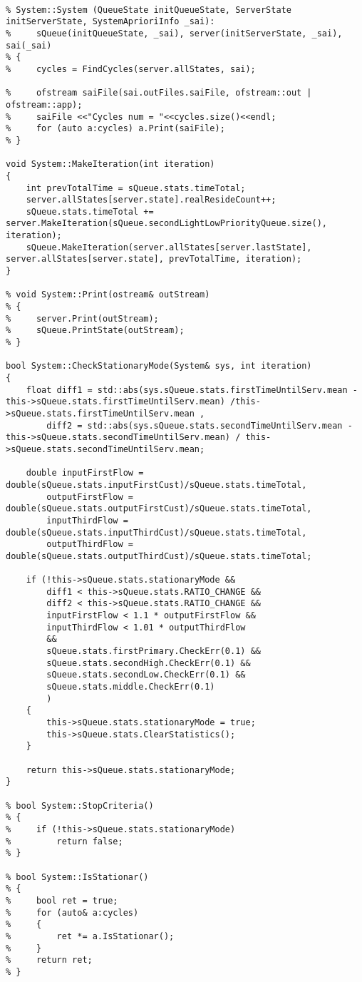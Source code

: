 \begin{lstlisting}[language={[ISO]C++}]
% #include "system.h"

% System::System (QueueState initQueueState, ServerState initServerState, SystemAprioriInfo _sai):
%     sQueue(initQueueState, _sai), server(initServerState, _sai), sai(_sai)
% {
%     cycles = FindCycles(server.allStates, sai);

%     ofstream saiFile(sai.outFiles.saiFile, ofstream::out | ofstream::app);
%     saiFile <<"Cycles num = "<<cycles.size()<<endl;
%     for (auto a:cycles) a.Print(saiFile);
% }

void System::MakeIteration(int iteration)
{
    int prevTotalTime = sQueue.stats.timeTotal;
    server.allStates[server.state].realResideCount++;
    sQueue.stats.timeTotal += server.MakeIteration(sQueue.secondLightLowPriorityQueue.size(), iteration);
    sQueue.MakeIteration(server.allStates[server.lastState], server.allStates[server.state], prevTotalTime, iteration);
}

% void System::Print(ostream& outStream)
% {
%     server.Print(outStream);
%     sQueue.PrintState(outStream);
% }

bool System::CheckStationaryMode(System& sys, int iteration)
{
    float diff1 = std::abs(sys.sQueue.stats.firstTimeUntilServ.mean - this->sQueue.stats.firstTimeUntilServ.mean) /this->sQueue.stats.firstTimeUntilServ.mean ,
        diff2 = std::abs(sys.sQueue.stats.secondTimeUntilServ.mean - this->sQueue.stats.secondTimeUntilServ.mean) / this->sQueue.stats.secondTimeUntilServ.mean;

    double inputFirstFlow = double(sQueue.stats.inputFirstCust)/sQueue.stats.timeTotal,
        outputFirstFlow = double(sQueue.stats.outputFirstCust)/sQueue.stats.timeTotal,
        inputThirdFlow = double(sQueue.stats.inputThirdCust)/sQueue.stats.timeTotal,
        outputThirdFlow = double(sQueue.stats.outputThirdCust)/sQueue.stats.timeTotal;

    if (!this->sQueue.stats.stationaryMode && 
        diff1 < this->sQueue.stats.RATIO_CHANGE &&
        diff2 < this->sQueue.stats.RATIO_CHANGE &&
        inputFirstFlow < 1.1 * outputFirstFlow &&
        inputThirdFlow < 1.01 * outputThirdFlow
        &&
        sQueue.stats.firstPrimary.CheckErr(0.1) &&
        sQueue.stats.secondHigh.CheckErr(0.1) &&
        sQueue.stats.secondLow.CheckErr(0.1) &&
        sQueue.stats.middle.CheckErr(0.1)
        )
    {
        this->sQueue.stats.stationaryMode = true;
        this->sQueue.stats.ClearStatistics();
    }

    return this->sQueue.stats.stationaryMode;
}

% bool System::StopCriteria()
% {
%     if (!this->sQueue.stats.stationaryMode)
%         return false;
% }

% bool System::IsStationar()
% {
%     bool ret = true;
%     for (auto& a:cycles)
%     {
%         ret *= a.IsStationar();
%     }
%     return ret;
% }
\end{lstlisting}




